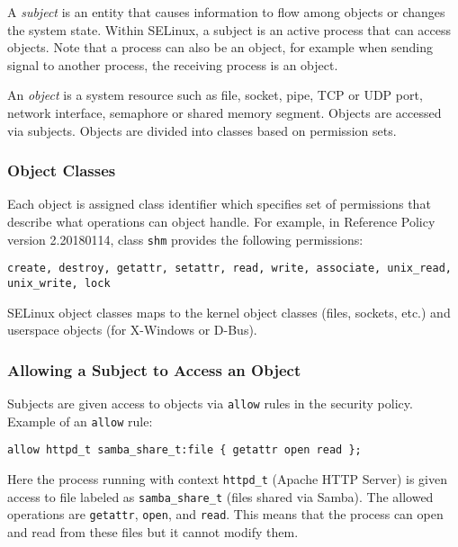 A \emph{subject} is an entity that causes information to flow among objects or
changes the system state. Within SELinux, a subject is an active process that
can access objects. Note that a process can also be an object, for example when
sending signal to another process, the receiving process is an object.

An \emph{object} is a system resource such as file, socket, pipe, TCP or UDP
port, network interface, semaphore or shared memory segment. Objects are
accessed via subjects. Objects are divided into classes based on permission
sets.

\subsubsection{Object Classes}
Each object is assigned class identifier which specifies set of permissions that
describe what operations can object handle. For example, in Reference Policy
version 2.20180114, class \texttt{shm} provides the following permissions:
\begin{lstlisting}
create, destroy, getattr, setattr, read, write, associate, unix_read,
unix_write, lock
\end{lstlisting}
SELinux object classes maps to the kernel object classes (files, sockets, etc.)
and userspace objects (for X-Windows or D-Bus).

\subsubsection{Allowing a Subject to Access an Object}
Subjects are given access to objects via \texttt{allow} rules in the security
policy. Example of an \texttt{allow} rule:
\begin{lstlisting}
allow httpd_t samba_share_t:file { getattr open read };
\end{lstlisting}
Here the process running with context \texttt{httpd\_t} (Apache HTTP Server) is
given access to file labeled as \texttt{samba\_share\_t} (files shared via
Samba). The allowed operations are \texttt{getattr}, \texttt{open}, and
\texttt{read}. This means that the process can open and read from these files
but it cannot modify them.

